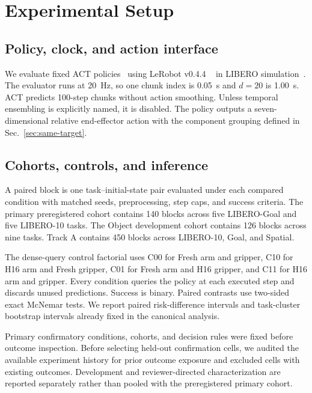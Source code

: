\section{Experimental Setup}
\label{sec:setup}

\subsection{Policy, clock, and action interface}

We evaluate fixed ACT policies~\cite{zhao2023act} using LeRobot v0.4.4
~\cite{cadene2026lerobot} in LIBERO simulation~\cite{liu2023libero}. The
evaluator runs at 20~Hz, so one chunk index is 0.05~s and $d=20$ is 1.00~s.
ACT predicts 100-step chunks without action smoothing. Unless temporal
ensembling is explicitly named, it is disabled. The policy outputs a
seven-dimensional relative end-effector action with the component grouping
defined in Sec.~\ref{sec:same-target}.

\subsection{Cohorts, controls, and inference}

A paired block is one task--initial-state pair evaluated under each compared
condition with matched seeds, preprocessing, step caps, and success criteria.
The primary preregistered cohort contains 140 blocks across five LIBERO-Goal
and five LIBERO-10 tasks. The Object development cohort contains 126 blocks
across nine tasks. Track A contains 450 blocks across LIBERO-10, Goal, and
Spatial.

The dense-query control factorial uses C00 for Fresh arm and gripper, C10 for
H16 arm and Fresh gripper, C01 for Fresh arm and H16 gripper, and C11 for H16
arm and gripper. Every condition queries the policy at each executed step and
discards unused predictions. Success is binary. Paired contrasts use two-sided
exact McNemar tests. We report paired risk-difference intervals and
task-cluster bootstrap intervals already fixed in the canonical analysis.

Primary confirmatory conditions, cohorts, and decision rules were fixed before
outcome inspection. Before selecting held-out confirmation cells, we audited
the available experiment history for prior outcome exposure and excluded cells
with existing outcomes. Development and reviewer-directed characterization are
reported separately rather than pooled with the preregistered primary cohort.

